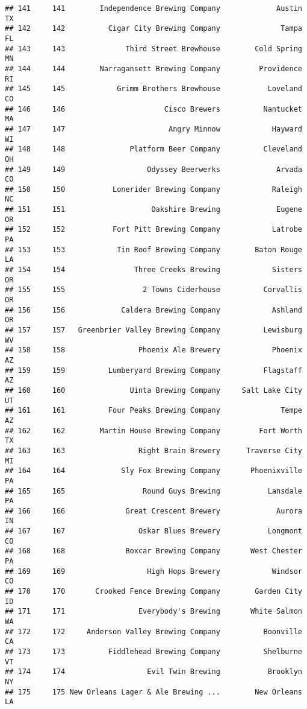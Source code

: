 \documentclass[
]{article}
\begin{document}
\begin{verbatim}
## 141     141        Independence Brewing Company             Austin    TX
## 142     142          Cigar City Brewing Company              Tampa    FL
## 143     143              Third Street Brewhouse        Cold Spring    MN
## 144     144        Narragansett Brewing Company         Providence    RI
## 145     145            Grimm Brothers Brewhouse           Loveland    CO
## 146     146                       Cisco Brewers          Nantucket    MA
## 147     147                        Angry Minnow            Hayward    WI
## 148     148               Platform Beer Company          Cleveland    OH
## 149     149                   Odyssey Beerwerks             Arvada    CO
## 150     150           Lonerider Brewing Company            Raleigh    NC
## 151     151                    Oakshire Brewing             Eugene    OR
## 152     152           Fort Pitt Brewing Company            Latrobe    PA
## 153     153            Tin Roof Brewing Company        Baton Rouge    LA
## 154     154                Three Creeks Brewing            Sisters    OR
## 155     155                  2 Towns Ciderhouse          Corvallis    OR
## 156     156             Caldera Brewing Company            Ashland    OR
## 157     157   Greenbrier Valley Brewing Company          Lewisburg    WV
## 158     158                 Phoenix Ale Brewery            Phoenix    AZ
## 159     159          Lumberyard Brewing Company          Flagstaff    AZ
## 160     160               Uinta Brewing Company     Salt Lake City    UT
## 161     161          Four Peaks Brewing Company              Tempe    AZ
## 162     162        Martin House Brewing Company         Fort Worth    TX
## 163     163                 Right Brain Brewery      Traverse City    MI
## 164     164             Sly Fox Brewing Company       Phoenixville    PA
## 165     165                  Round Guys Brewing           Lansdale    PA
## 166     166              Great Crescent Brewery             Aurora    IN
## 167     167                 Oskar Blues Brewery           Longmont    CO
## 168     168              Boxcar Brewing Company       West Chester    PA
## 169     169                   High Hops Brewery            Windsor    CO
## 170     170       Crooked Fence Brewing Company        Garden City    ID
## 171     171                 Everybody's Brewing       White Salmon    WA
## 172     172     Anderson Valley Brewing Company          Boonville    CA
## 173     173          Fiddlehead Brewing Company          Shelburne    VT
## 174     174                   Evil Twin Brewing           Brooklyn    NY
## 175     175 New Orleans Lager & Ale Brewing ...        New Orleans    LA

\end{verbatim}
\end{document}
